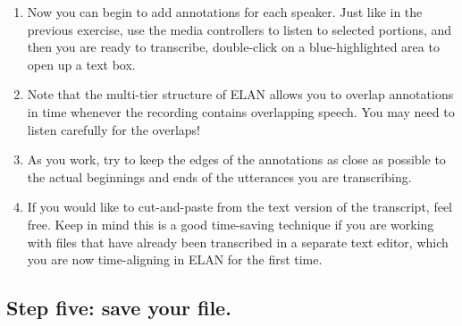 \documentclass[letterpaper,12pt]{article}
\begin{document}
\begin{enumerate}
\item Now you can begin to add annotations for each speaker. Just like in the previous exercise, use the media controllers to listen to selected portions, and then you are ready to transcribe, double-click on a blue-highlighted area to open up a text box.
\item Note that the multi-tier structure of ELAN allows you to overlap annotations in time whenever the recording contains overlapping speech. You may need to listen carefully for the overlaps!
\item As you work, try to keep the edges of the annotations as close as possible to the actual beginnings and ends of the utterances you are transcribing.
\item If you would like to cut-and-paste from the text version of the transcript, feel free. Keep in mind this is a good time-saving technique if you are working with files that have already been transcribed in a separate text editor, which you are now time-aligning in ELAN for the first time.
\end{enumerate}
\subsection*{Step five: save your file.}
\end{document}
